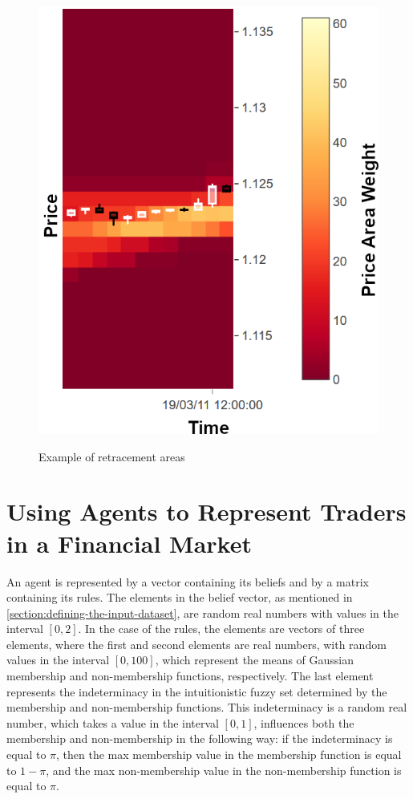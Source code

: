 \begin{figure}
\caption{Example of retracement areas} \centering
\includegraphics[width=1.0\textwidth]{img/retracement-areas.png}
\label{figure:example-of-retracement-areas}
\end{figure}

\section{Using Agents to Represent Traders in a Financial Market}
\label{section:using-agents-to-represent-traders-in-a-financial-market:implementation}

An agent is represented by a vector containing its beliefs and by a matrix
containing its rules. The elements in the belief vector, as mentioned in
\ref{section:defining-the-input-dataset}, are random real numbers with values in
the interval $[0, 2]$. In the case of the rules, the elements are vectors of
three elements, where the first and second elements are real numbers, with
random values in the interval $[0, 100]$, which represent the means of Gaussian
membership and non-membership functions, respectively. The last element
represents the indeterminacy in the intuitionistic fuzzy set determined by the
membership and non-membership functions. This indeterminacy is a random real
number, which takes a value in the interval $[0, 1]$, influences both the
membership and non-membership in the following way: if the indeterminacy is
equal to $\pi$, then the max membership value in the membership function is
equal to $1 - \pi$, and the max non-membership value in the non-membership
function is equal to $\pi$.

